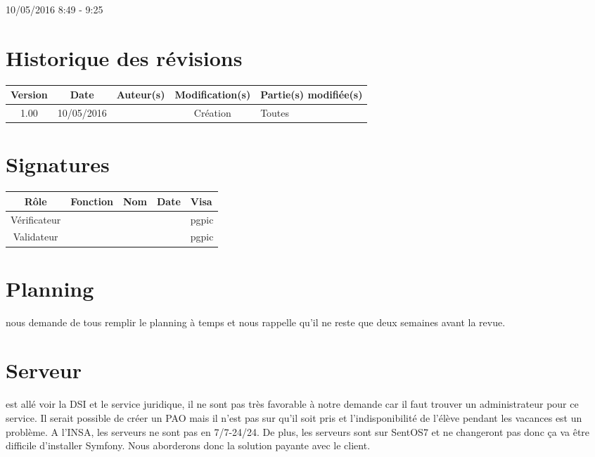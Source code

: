 \documentclass [a4paper] {article}
\begin{document}
10/05/2016			 				%
\hfill   
\hfill 	 8:49 - 9:25				%



\section*{Historique des révisions}
\begin{center}
			\begin{tabular}{| c | c | c | c | p{4cm} |}
				\hline
				\rowcolor{Gray}
				Version & Date & Auteur(s) & Modification(s) & Partie(s) modifiée(s)		 \\
				\hline
				1.00 & 10/05/2016 & \Pierre & Création & Toutes \\
		\hline		
			\end{tabular}
		\end{center}

\section*{Signatures}

		\begin{center}
			\begin{tabular}{| c | c | c | c | p{4cm} |}
				\hline
				\rowcolor{Gray}
				Rôle & Fonction & Nom & Date & Visa		 \\
				\hline
				Vérificateur & \RQA & \Kafui &  & pgpic \\[30pt]
				\hline
				Validateur & \CP & \Sergi &  & pgpic \\[30pt]	
				\hline
			\end{tabular}
		\end{center}


\section{Planning}
\Sergi{} nous demande de tous remplir le planning à temps et nous rappelle qu'il ne reste que deux semaines avant la revue.

\section{Serveur}
\Sergi{} est allé voir la DSI et le service juridique, il ne sont pas très favorable à notre demande car il faut trouver un administrateur pour ce service. Il serait possible de créer un PAO mais il n'est pas sur qu'il soit pris et l'indisponibilité de l'élève pendant les vacances est un problème. A l'INSA, les serveurs ne sont pas en 7/7-24/24. De plus, les serveurs sont sur SentOS7 et ne changeront pas donc ça va être difficile d'installer Symfony. Nous aborderons donc la solution payante avec le client.
\end{document}
